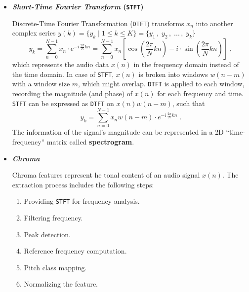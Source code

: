 \documentclass[12pt]{report}
\begin{document}
	\begin{itemize}
		\item \textbf{\textit{Short-Time Fourier Transform} ({\tt STFT})}
		\par Discrete-Time Fourier Transformation ({\tt DTFT}) transforms $x_n$ into another complex series $y(k) = \{ y_k \; | \; 1 \le k \le K \} = \{ y_1 \, , \; y_2 \, , \; ... \, , \; y_k \}$
		\begin{equation}\label{eq:1}
			y_k = \sum_{n = 0}^{N - 1} x_n \cdot e^{-i \, \frac{2 \pi}{N}kn} = \sum_{n = 0}^{N-1} x_n \left[ \cos{\left( \frac{2 \pi}{N} kn \right)} - i \cdot \sin{\left( \frac{2 \pi}{N} kn \right)} \right] \; ,
		\end{equation}
		which represents the audio data $x(n)$ in the frequency domain instead of the time domain. In case of {\tt STFT}, $x(n)$ is broken into windows $w(n - m)$ with a window size $m$, which might overlap. {\tt DTFT} is applied to each window, recording the magnitude (and phase) of $x(n)$ for each frequency and time. {\tt STFT} can be expressed as {\tt DTFT} on $x(n)w(n - m)$, such that
		\begin{equation}\label{eq:2}
			y_k = \sum_{n = 0}^{N - 1} x_n w(n - m) \cdot e^{-i \, \frac{2 \pi}{N} kn} \; .
		\end{equation}
		The information of the signal's magnitude can be represented in a 2D ``time-frequency'' matrix called \textbf{spectrogram}.
		
		\item \textbf{\textit{Chroma}}
		\par Chroma features represent he tonal content of an audio signal $x(n)$. The extraction process includes the following steps:
		\begin{enumerate}
			\item Providing {\tt STFT} for frequency analysis.
			\item Filtering frequency.
			\item Peak detection.
			\item Reference frequency computation.
			\item Pitch class mapping.
			\item Normalizing the feature.
		\end{enumerate}
	

\end{itemize}
\end{document}
